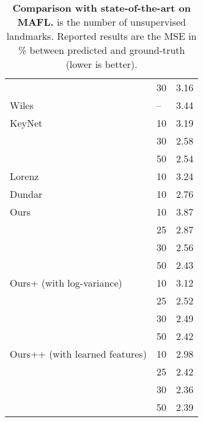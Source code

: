 \documentclass[nohyperref]{article}
\theoremstyle{plain}
\theoremstyle{definition}
\theoremstyle{remark}
\begin{document}
\begin{table}
\begin{tabular}{@{}llc@{}}
                                           & 30   & 3.16                           \\
    Wiles~\citep{wiles2018self}              & {--} & 3.44                           \\ 
    KeyNet~\citep{jakab2018unsupervised}   & 10 &   3.19                            \\
                                            & 30 & 2.58                             \\
                                            & 50 & 2.54                             \\ 
    Lorenz~\citep{lorenz2019unsupervised}   & 10 &   3.24                            \\
    Dundar~\citep{dundar2021unsupervised}   & 10 &   2.76                      \\ \midrule
    Ours                                    & 10   & 3.87                         \\
                                            & 25   & 2.87                            \\
                                            & 30   & 2.56                            \\
                                            & 50   & 2.43                          \\ \midrule
    Ours+ (with log-variance)                   & 10   & 3.12                         \\
                                            & 25   & 2.52                            \\
                                            & 30   & 2.49                            \\
                                            & 50   & 2.42                          \\ \midrule
    Ours++ (with learned features)          & 10   & 2.98                         \\
                                            & 25   & 2.42                            \\
                                            & 30   & 2.36                            \\
                                            & 50   & 2.39                         \\ \bottomrule
    \end{tabular}
    \caption{{\bf Comparison with state-of-the-art on MAFL.}  is the number of unsupervised landmarks. Reported results are the MSE in \% between predicted and ground-truth (lower is better).}
    \label{tab_apndx:face-sota}
\end{table}
\end{document}
